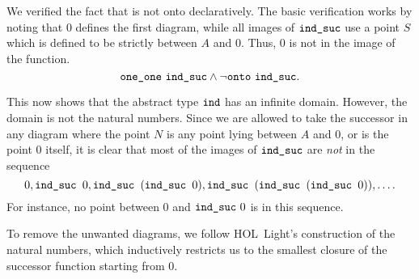 We verified the fact that  is not onto declaratively. The basic verification works by noting that $0$ defines the first diagram, while all images of $\texttt{ind\_suc}$ use a point $S$ which is defined to be strictly between $A$ and $0$. Thus, $0$ is not in the image of the function.
\begin{equation*}
\texttt{one\_one}\ \texttt{ind\_suc} \wedge \neg\texttt{onto}\ \texttt{ind\_suc}.
\end{equation*}

This now shows that the abstract type $\texttt{ind}$ has an infinite domain. However, the domain is not the natural numbers. Since we are allowed to take the successor in any diagram where the point $N$ is any point lying between $A$ and $0$, or is the point $0$ itself, it is clear that most of the images of $\texttt{ind\_suc}$ are \emph{not} in the sequence
\begin{displaymath}
0, \texttt{ind\_suc } 0, \texttt{ind\_suc }(\texttt{ind\_suc } 0), \texttt{ind\_suc }(\texttt{ind\_suc }(\texttt{ind\_suc } 0)),  \ldots.
\end{displaymath}
For instance, no point between $0$ and $\texttt{ind\_suc}\ 0$ is in this sequence.

To remove the unwanted diagrams, we follow HOL~Light's construction of the natural numbers, which inductively restricts us to the smallest closure of the successor function starting from $0$. 




